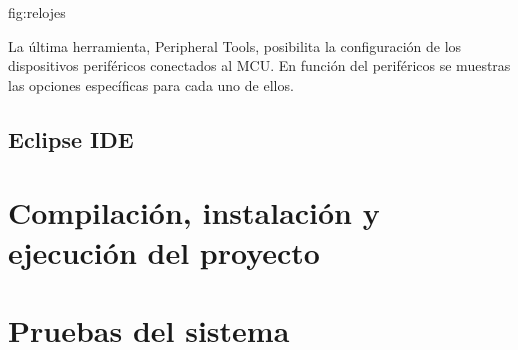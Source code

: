 {fig:relojes}{}

La última herramienta, Peripheral Tools, posibilita la configuración de los
dispositivos periféricos conectados al MCU. En función del periféricos se
muestras las opciones específicas para cada uno de ellos.



\subsection{Eclipse IDE} \label{sec:man-dev-eclipse}

\cleardoublepage
\section{Compilación, instalación y ejecución del proyecto}

\section{Pruebas del sistema}

